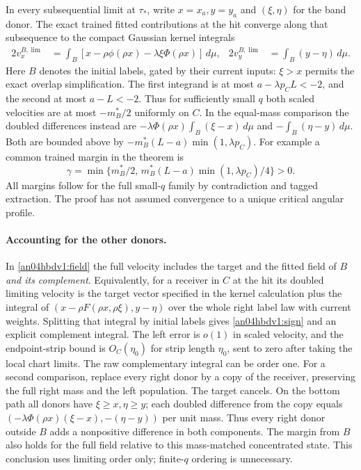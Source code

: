 \documentclass[11pt]{article}
\newcommand{\dd}{\,d}
\begin{document}
In every subsequential limit at $\tau_*$, write $x=x_a,y=y_a$ and
$(\xi,\eta)$ for the band donor. The exact trained fitted contributions
at the hit converge along that subsequence to the compact Gaussian
kernel integrals
\begin{align}
 2v_x^{B,\lim}
   &=\int_B[x-\rho\phi(\rho x)-\lambda\xi\Phi(\rho x)]\dd\mu,
 &2v_y^{B,\lim}&=\int_B(y-\eta)\dd\mu .\label{an04hbdv1:sign}
\end{align}
Here $B$ denotes the initial labels, gated by their current inputs:
$\xi>x$ permits the exact overlap simplification. The first integrand
is at most $a-\lambda p_C L<-2$, and the second at most $a-L<-2$.
Thus for sufficiently small $q$ both scaled velocities are at most
$-m_B^*/2$ uniformly on $C$. In the equal-mass comparison the
doubled differences instead are
$-\lambda\Phi(\rho x)\int_B(\xi-x)\dd\mu$ and
$-\int_B(\eta-y)\dd\mu$. Both are bounded above by
$-m_B^*(L-a)\min(1,\lambda p_C)$.
For example a common trained margin in the theorem is
\[
 \gamma=\min\{m_B^*/2,\,
          m_B^*(L-a)\min(1,\lambda p_C)/4\}>0 .
\]
All margins follow for the full small-$q$ family by contradiction
and tagged extraction. The proof has not assumed convergence to a
unique critical angular profile.

\paragraph{Accounting for the other donors.}
In \eqref{an04hbdv1:field} the full velocity includes the target
and the fitted field of $B$ \emph{and its complement}. Equivalently,
for a receiver in $C$ at the hit its doubled limiting velocity
is the target vector specified in the kernel calculation plus the
integral of $(x-\rho F(\rho x,\rho\xi),y-\eta)$ over the whole
right label law with current weights. Splitting that integral by
initial labels gives \eqref{an04hbdv1:sign} and an explicit complement
integral. The left error is $o(1)$ in scaled velocity, and the
endpoint-strip bound is $O_C(\eta_0)$ for strip length $\eta_0$,
sent to zero after taking the local chart limits. The raw complementary integral can be order one.
For a second comparison, replace every right donor by a copy of the
receiver, preserving the full right mass and the left population.
The target cancels. On the bottom path all donors have
$\xi\ge x,\eta\ge y$; each doubled difference from the copy equals
$(-\lambda\Phi(\rho x)(\xi-x),-(\eta-y))$ per unit mass.
Thus every right donor outside $B$ adds a nonpositive difference in
both components. The margin from $B$ also holds for the full field
relative to this mass-matched concentrated state. This conclusion
uses limiting order only; finite-$q$ ordering is unnecessary.
\end{document}
